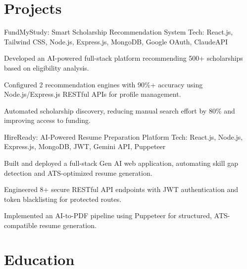\documentclass[a4paper,10pt]{article}
\begin{document}
\vspace{-5pt}


\section{Projects}


\resumeSubheading
{FundMyStudy: Smart Scholarship Recommendation System}
{}
{Tech: React.js, Tailwind CSS, Node.js, Express.js, MongoDB, Google OAuth, ClaudeAPI}
{}

\resumeItemListStart
\item Developed an AI-powered full-stack platform recommending 500+ scholarships based on eligibility analysis.
\item Configured 2 recommendation engines with 90\%+ accuracy using Node.js/Express.js RESTful APIs for profile management.
\item Automated scholarship discovery, reducing manual search effort by 80\% and improving access to funding.
\resumeItemListEnd

\vspace{-5pt}


\resumeSubheading
{HireReady: AI-Powered Resume Preparation Platform}
{}
{Tech: React.js, Node.js, Express.js, MongoDB, JWT, Gemini API, Puppeteer}
{}

\resumeItemListStart
\item Built and deployed a full-stack Gen AI web application, automating skill gap detection and ATS-optimized resume generation.
\item Engineered 8+ secure RESTful API endpoints with JWT authentication and token blacklisting for protected routes.
\item Implemented an AI-to-PDF pipeline using Puppeteer for structured, ATS-compatible resume generation.
\resumeItemListEnd

\vspace{-5pt}


\section{Education}
\end{document}
